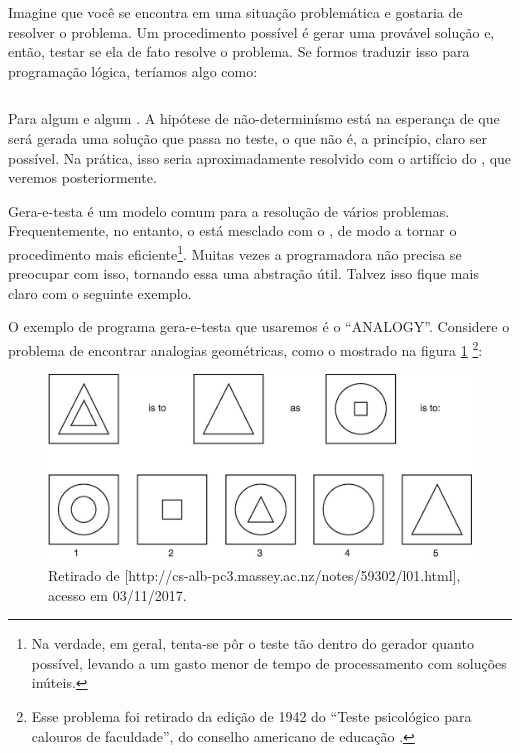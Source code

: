   Imagine que você se encontra em uma situação problemática e gostaria de resolver o problema. Um procedimento possível é gerar uma provável solução e, então, testar se ela de fato resolve o problema. Se formos traduzir isso para programação lógica, teríamos algo como:

    \begin{listing}
\inputminted{prolog}{../Exemplos/Cap1/prog2_encontra.pl}
    \end{listing}

Para algum  e algum . A hipótese de não-determinísmo está na esperança de que será gerada uma solução que passa no teste, o que não é, a princípio, claro ser possível. Na prática, isso seria aproximadamente resolvido com o artifício do , que veremos posteriormente.

Gera-e-testa é um modelo comum para a resolução de vários problemas. Frequentemente, no entanto, o  está mesclado com o , de modo a tornar o procedimento mais eficiente\footnote{Na verdade, em geral, tenta-se pôr o teste tão dentro do gerador quanto possível, levando a um gasto menor de tempo de processamento com soluções inúteis.}. Muitas vezes a programadora não precisa se preocupar com isso, tornando essa uma abstração útil. Talvez isso fique mais claro com o seguinte exemplo.

O exemplo de programa gera-e-testa que usaremos é o ``ANALOGY''. Considere o problema de encontrar analogias geométricas, como o mostrado na figura \ref{fig:psi} \footnote{Esse problema foi retirado da edição de 1942 do ``Teste psicológico para calouros de faculdade'', do conselho americano de educação \cite{evans}.}:

\begin{figure}[h]
  \caption{Retirado de [http://cs-alb-pc3.massey.ac.nz/notes/59302/l01.html], acesso em 03/11/2017.}\label{fig:psi}
  \centering
  \includegraphics[width=\linewidth]{analogy}
\end{figure}


